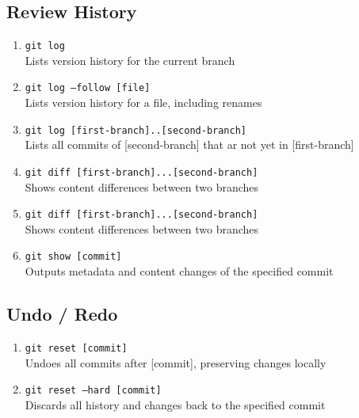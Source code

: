 \documentclass[a4paper, twoside, 11pt]{extarticle}
\newenvironment{enumx} {
    \begin{enumerate}[leftmargin=*]
    \setlength{\topsep}{0pt}
    \setlength{\itemsep}{0pt}
    \setlength{\parskip}{0pt}
    \setlength{\parsep}{0pt}
    }
{\end{enumerate}}
\begin{document}
\begin{multicols}{3}
\subsection{Review History}
\begin{enumx}
    \item \texttt{git log}\\
    Lists version history for the current branch
    \item \texttt{git log --follow [file]}\\
    Lists version history for a file, including renames
    \item \texttt{git log [first-branch]..[second-branch]}\\
    Lists all commits of [second-branch] that ar not yet in [first-branch]
    \item \texttt{git diff [first-branch]...[second-branch]}\\
    Shows content differences between two branches
    \item \texttt{git diff [first-branch]...[second-branch]}\\
    Shows content differences between two branches
    \item \texttt{git show [commit]}\\
    Outputs metadata and content changes of the specified commit
\end{enumx}

\subsection{Undo / Redo}
\begin{enumx}
    \item \texttt{git reset [commit]}\\
    Undoes all commits after [commit], preserving changes locally
    \item \texttt{git reset --hard [commit]}\\
    Discards all history and changes back to the specified commit
\end{enumx}


\end{multicols}
\end{document}
